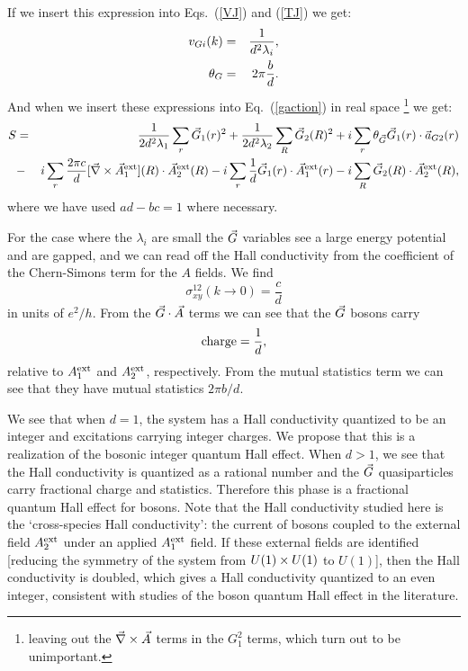 If we insert this expression into Eqs.~(\ref{VJ}) and (\ref{TJ}) we get:
\begin{eqnarray}
v_{G i}(k)&=&\frac{1}{d^2\lambda_i},\label{vgd2} \\
\theta_{G}&=&2\pi\frac{b}{d}.\label{tg}
\end{eqnarray}
And when we insert these expressions into Eq.~(\ref{gaction}) in real space
\footnote{leaving out the $\vec{\nabla}\times\vec{A}$ terms in the $G_1^2$ terms, which turn out to be unimportant.}
we get:
\begin{eqnarray}
S&=&\frac{1}{2d^2\lambda_1}\sum_r \vec{G}_1(r)^2
+\frac{1}{2d^2\lambda_2}\sum_R \vec{G}_2(R)^2
+i\sum_r \theta_{\vec{G}} \vec{G}_1(r)\cdot \vec{a}_{G2}(r)\\
&-&i\sum_r \frac{2\pi c}{d} [\vec{\nabla}\times\vec{A}_{1}^{\rm ext}](R)\cdot \vec{A}_{2}^{\rm ext}(R)\nonumber
- i\sum_r \frac{1}{d} \vec{G}_1(r) \cdot \vec{A}_{1}^{\rm ext}(r) -i\sum_R\vec{G}_2(R) \cdot \vec{A}_{2}^{\rm ext}(R),
\label{gaction}
\end{eqnarray}
where we have used $ad-bc=1$ where necessary. 

For the case where the $\lambda_i$ are small the $\vec{G}$ variables see a large energy potential and are gapped, and we can read off the Hall conductivity from the coefficient of the Chern-Simons term for the $A$ fields. We find
\begin{equation}
\sigma_{xy}^{12}(k\rightarrow0)=\frac{c}{d}
\label{sigma}
\end{equation}
in units of $e^2/h$. From the $\vec{G}\cdot\vec{A}$ terms we can see that the $\vec{G}$ bosons carry 
\begin{equation}
{\rm charge} = \frac{1}{d}, \label{charge1d}
\end{equation}
relative to $A^{\rm ext}_1$ and $A^{\rm ext}_2$, respectively.
From the mutual statistics term we can see that they have mutual statistics $2\pi b/d$. 

We see that when $d=1$, the system has a Hall conductivity quantized to be an integer and excitations carrying integer charges. We propose that this is a realization of the bosonic integer quantum Hall effect.\cite{LuVishwanath2012}  When $d>1$, we see that the Hall conductivity is quantized as a rational number and the $\vec{G}$ quasiparticles carry fractional charge and statistics. Therefore this phase is a fractional quantum Hall effect for bosons. Note that the Hall conductivity studied here is the `cross-species Hall conductivity': the current of bosons coupled to the external field $A^{\rm ext}_2$ under an applied $A^{\rm ext}_1$ field. If these external fields are identified [reducing the symmetry of the system from $U(1)\times U(1)$ to $U(1)$], then the Hall conductivity is doubled, which gives a Hall conductivity quantized to an even integer, consistent with studies of the boson quantum Hall effect in the literature.

